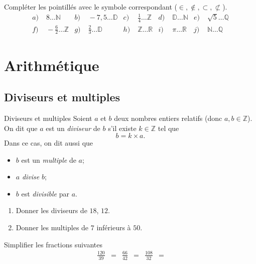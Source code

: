 \documentclass[11pt]{article}
\begin{document}
\begin{exemple}
  Compléter les pointillés avec le symbole correspondant ($\in, \notin,
  \subset, \not\subset$).
\begin{align*}
  a)&\; 8 \ldots \mathbb{N} &
  b)&\; -7,5 \ldots \mathbb{D} &
  c)&\; \frac{1}{4} \ldots \mathbb{Z} &
  d)&\; \mathbb{D} \ldots \mathbb{N} &
  e)&\; \sqrt 5 \ldots \mathbb{Q} \\
  f)&\; -\frac{6}{2} \ldots \mathbb{Z} &
  g)&\; \frac{2}{3} \ldots \mathbb{D} &
  h)&\; \mathbb{Z} \ldots \mathbb{R} &
  i)&\; \pi \ldots \mathbb{R} &
  j)&\; \mathbb{N} \ldots \mathbb{Q}
\end{align*}
\end{exemple}

\section{Arithmétique}
\subsection{Diviseurs et multiples}
\begin{defi}{Diviseurs et multiples}
  Soient $a$ et $b$ deux nombres entiers relatifs (donc $a,b\in\mathbb{Z}$). On
  dit que $a$ est un \emph{diviseur} de $b$ s'il existe $k\in\mathbb{Z}$ tel
  que
  \[
    b = k\times a.
  \]
  Dans ce cas, on dit aussi que
  \begin{itemize}
    \item $b$ est un \emph{multiple} de $a$;
    \item $a$ \emph{divise} $b$;
    \item $b$ est \emph{divisible} par $a$.
  \end{itemize}
\end{defi}
\begin{exemple}
  \begin{enumerate}
    \item Donner les diviseurs de $18$, $12$.
    \item Donner les multiples de $7$ inférieurs à $50$.
  \end{enumerate}
\end{exemple}
\begin{exemple}
  Simplifier les fractions suivantes
  \begin{align*}
    \frac{120}{39} &= &
    \frac{66}{42} &= &
    \frac{108}{32} &=
  \end{align*}
\end{exemple}
\end{document}

